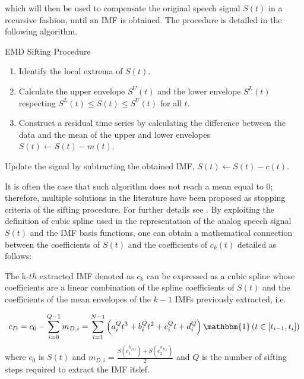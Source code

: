 which will then be used to compensate the original speech signal $S(t)$ in a recursive fashion, until an IMF is obtained.  The procedure is detailed in the following algorithm.

\begin{algorithm}[H]
\small

\label{sifting_algorithm}
\caption{EMD Sifting Procedure}

\BlankLine
\addtolength\linewidth{-12ex}

 
{
{
\begin{enumerate}[label=(\roman*)]

\item Identify the local extrema of $S(t)$.  %
\item Calculate the upper envelope $S^U(t)$ and the lower envelope $S^L(t)$ respecting $S^L(t) \leq S(t) \leq S^U(t)$ for all $t$. 
%
\item Construct a residual time series by calculating the difference between the data and the mean of the upper and lower envelopes $S(t)\leftarrow S(t) - m(t)$.

\end{enumerate}
}



Update the signal by subtracting the obtained IMF, $S(t) \leftarrow S(t)-c(t)$. 
\BlankLine
\BlankLine

}
\end{algorithm}

\normalsize

It is often the case that such algorithm does not reach a mean equal to 0; therefore, multiple solutions in the literature have been proposed as stopping criteria of the sifting procedure. For further details see \cite{Machine}. By exploiting the definition of cubic spline used in the representation of the analog speech signal $S(t)$ and the IMF basis functions, one can obtain a mathematical connection between the coefficients of $S(t)$ and the coefficients of $c_k(t)$ detailed as follows: 

\begin{prop}
\label{prop_cs}
The k-$th$ extracted IMF denoted as $c_k$ can be expressed as a cubic spline whose coefficients are a linear combination of the spline coefficients of $S(t)$ and the coefficients of the mean envelopes of the $k-1$ IMFs previously extracted, i.e.

\begin{equation}
c_D = c_0 - \sum_{i=0}^{Q-1} m_{D,i} = \sum_{i=1}^{N-1} \left( a_i^Q t^3 + b_i^Q t^2 + c_i^Q t + d_i^Q \right) \mathbbm{1} \left( t \in \left[ t_{i-1}, t_i \right] \right)
\end{equation}
where $c_0$ is $S(t)$ and $m_{D,i} = \frac{S(e_1^{h_{D,i}})+S(e_2^{h_{D,i}})}{2}$ and $Q$ is the number of sifting steps required to extract the IMF itslef.
\end{prop}

